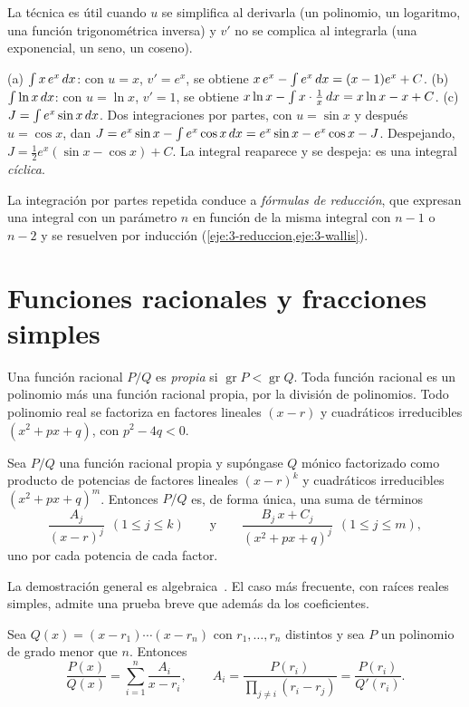 La técnica es útil cuando $u$ se simplifica al derivarla (un polinomio, un logaritmo, una función trigonométrica inversa) y $v'$ no se complica al integrarla (una exponencial, un seno, un coseno).

\begin{ejemplo}\label{ej:partes}
(a) $\int x\,e^{x}\mathop{}\!d x$: con $u=x$, $v'=e^{x}$, se obtiene $x\,e^{x}-\int e^{x}\mathop{}\!d x=(x-1)e^{x}+C$.
(b) $\int\ln x\mathop{}\!d x$: con $u=\ln x$, $v'=1$, se obtiene $x\ln x-\int x\cdot\frac1x\mathop{}\!d x=x\ln x-x+C$.
(c) $J=\int e^{x}\sin x\mathop{}\!d x$. Dos integraciones por partes, con $u=\sin x$ y después $u=\cos x$, dan $J=e^{x}\sin x-\int e^{x}\cos x\mathop{}\!d x=e^{x}\sin x-e^{x}\cos x-J$. Despejando, $J=\frac12e^{x}(\sin x-\cos x)+C$. La integral reaparece y se despeja: es una integral \emph{cíclica}.
\end{ejemplo}

La integración por partes repetida conduce a \emph{fórmulas de reducción}, que expresan una integral con un parámetro $n$ en función de la misma integral con $n-1$ o $n-2$ y se resuelven por inducción (\cref{eje:3-reduccion,eje:3-wallis}).

\section{Funciones racionales y fracciones simples}

Una función racional $P/Q$ es \emph{propia} si $\operatorname{gr}P<\operatorname{gr}Q$. Toda función racional es un polinomio más una función racional propia, por la división de polinomios. Todo polinomio real se factoriza en factores lineales $(x-r)$ y cuadráticos irreducibles $(x^{2}+px+q)$, con $p^{2}-4q<0$.

\begin{teorema}\label{teo:fracciones}
Sea $P/Q$ una función racional propia y supóngase $Q$ mónico factorizado como producto de potencias de factores lineales $(x-r)^{k}$ y cuadráticos irreducibles $(x^{2}+px+q)^{m}$. Entonces $P/Q$ es, de forma única, una suma de términos
\[
\frac{A_j}{(x-r)^{j}}\ \ (1\le j\le k)\qquad\text{y}\qquad\frac{B_j\,x+C_j}{(x^{2}+px+q)^{j}}\ \ (1\le j\le m),
\]
uno por cada potencia de cada factor.
\end{teorema}

La demostración general es algebraica~\cite[cap.~19]{spivak}. El caso más frecuente, con raíces reales simples, admite una prueba breve que además da los coeficientes.

\begin{proposicion}\label{prop:raices-simples}
Sea $Q(x)=(x-r_1)\cdots(x-r_n)$ con $r_1,\dots,r_n$ distintos y sea $P$ un polinomio de grado menor que $n$. Entonces
\[
\frac{P(x)}{Q(x)}=\sum_{i=1}^{n}\frac{A_i}{x-r_i},\qquad A_i=\frac{P(r_i)}{\prod_{j\neq i}(r_i-r_j)}=\frac{P(r_i)}{Q'(r_i)} .
\]
\end{proposicion}

